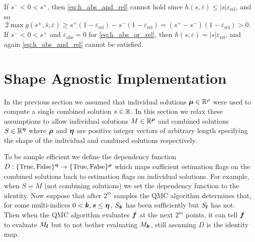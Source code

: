 \documentclass{article}[12pt]
\newcommand{\varepsabs}{\varepsilon_\text{abs}}
\newcommand{\varepsrel}{\varepsilon_\text{rel}}
\begin{document}
If $s^- < 0 < s^+$, then \eqref{eq:h_abs_and_rel} cannot hold since $h(s,\varepsilon) \le \lvert s \rvert \varepsrel$, and so
\begin{equation}
2 \max g(s^\pm,\hat{s},\varepsilon) \ge s^+ (1 - \varepsrel) - s^- (1  - \varepsrel) = (s^+ - s^-)(1 - \varepsrel) > 0.
\end{equation}
If $s^- < 0 < s^+$ and $\varepsabs = 0$ for \eqref{eq:h_abs_or_rel}, then $h(s,\varepsilon) = \lvert s \rvert \varepsrel$, and again \eqref{eq:h_abs_and_rel} cannot be satisfied.

\section{Shape Agnostic Implementation} \label{sec: Vectorized Implementation}

In the previous section we assumed that individual solutions $\bmu \in \bbR^\rho$ were used to compute a single combined solution $s \in \bbR$. In this section we relax these assumptions to allow individual solutions $M \in \bbR^{\brho}$ and combined solutions $S \in \bbR^{\bseta}$ where $\brho$ and $\bseta$ are positive integer vectors of arbitrary length specifying the shape of the individual and combined solutions respectively. 

To be sample efficient we define the dependency function $D: \{\True,\False\}^{\bseta} \to \{\True,\False\}^{\brho}$ which maps sufficient estimation flags on the combined solutions back to estimation flags on individual solutions. For example, when $S = M$ (not combining solutions) we set the dependency function to the identity. Now suppose that after $2^m$ samples the QMC algorithm determines that, for some multi-indices $0 < \bk,\bs \leq \bseta$, $S_{\bk}$ has been sufficiently but $S_{\bl}$ has not. Then when the QMC algorithm evaluates $\bf$ at the next $2^m$ points, it can tell $\bf$ to evaluate $M_{\bl}$ but to not bother evaluating $M_{\bk}$, still assuming $D$ is the identity map.
\end{document}

